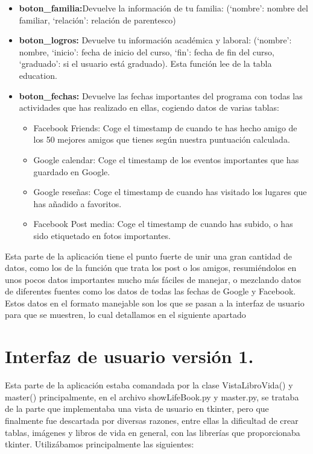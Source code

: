 \begin{itemize}
	\item \textbf{boton\_familia:}Devuelve la información de tu familia: (`nombre': nombre del familiar, `relación': relación de parentesco)
	\item \textbf{boton\_logros:} Devuelve tu información académica y laboral: (`nombre': nombre, `inicio': fecha de inicio del curso, `fin': fecha de fin del curso, `graduado': si el usuario está graduado). Esta función lee de la tabla education.
	
	\item \textbf{boton\_fechas:} Devuelve las fechas importantes del programa con todas las actividades que has realizado en ellas, cogiendo datos de varias tablas:
	\begin{itemize}
		\item Facebook Friends: Coge el timestamp de cuando te has hecho amigo de los 50 mejores amigos que tienes según nuestra puntuación calculada.
		\item Google calendar: Coge el timestamp de los eventos importantes que has guardado en Google.
		\item Google reseñas: Coge el timestamp de cuando has visitado los lugares que has añadido a favoritos.  
		\item Facebook Post media: Coge el timestamp de cuando has subido, o has sido etiquetado en fotos importantes.
	\end{itemize}

\end{itemize}

Esta parte de la aplicación tiene el punto fuerte de unir una gran cantidad de datos, como los de la función que trata los post o los amigos, resumiéndolos en unos pocos datos importantes mucho más fáciles de manejar, o mezclando datos de diferentes fuentes como los datos de todas las fechas de Google y Facebook. Estos datos en el formato manejable son los que se pasan a la interfaz de usuario para que se muestren, lo cual detallamos en el siguiente apartado

\section{Interfaz de usuario versión 1.}

Esta parte de la aplicación estaba comandada por la clase VistaLibroVida() y master() principalmente, en el archivo showLifeBook.py y master.py, se trataba de la parte que implementaba una vista de usuario en tkinter, pero que finalmente fue descartada por diversas razones, entre ellas la dificultad de crear tablas, imágenes y libros de vida en general, con las librerías que proporcionaba tkinter. Utilizábamos principalmente las siguientes:

